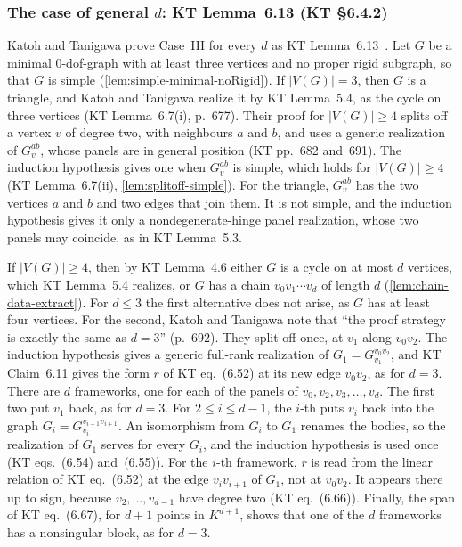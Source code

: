 \subsubsection{The case of general \texorpdfstring{$d$}{d}: KT Lemma~6.13 (KT \S6.4.2)}

Katoh and Tanigawa prove Case~III for every $d$ as KT
Lemma~6.13~\cite[pp.~692--698]{katohTanigawa2011}. Let $G$ be a
minimal $0$-dof-graph with at least three vertices and no proper rigid
subgraph, so that $G$ is simple (\cref{lem:simple-minimal-noRigid}).
If $|V(G)| = 3$, then $G$ is a triangle, and Katoh and Tanigawa
realize it by KT Lemma~5.4, as the cycle on three vertices (KT
Lemma~6.7(i), p.~677). Their proof for $|V(G)| \ge 4$ splits off a
vertex $v$ of degree two, with neighbours $a$ and $b$, and uses a
generic realization of $G_v^{ab}$, whose panels are in general position
(KT pp.~682 and~691). The induction hypothesis gives one when
$G_v^{ab}$ is simple, which holds for $|V(G)| \ge 4$ (KT Lemma~6.7(ii),
\cref{lem:splitoff-simple}). For the triangle, $G_v^{ab}$ has the
two vertices $a$ and $b$ and two edges that join them. It is not
simple, and the induction hypothesis gives it only a
nondegenerate-hinge panel realization, whose two panels may coincide,
as in KT Lemma~5.3.

If $|V(G)| \ge 4$, then by KT Lemma~4.6 either $G$ is a cycle on at
most $d$ vertices, which KT Lemma~5.4 realizes, or $G$ has a chain
$v_0 v_1 \cdots v_d$ of length $d$ (\cref{lem:chain-data-extract}).
For $d \le 3$ the first alternative does not arise, as $G$ has at
least four vertices. For the second, Katoh and Tanigawa note that
``the proof strategy is exactly the same as $d = 3$'' (p.~692). They
split off once, at $v_1$ along $v_0 v_2$. The induction hypothesis
gives a generic full-rank realization of $G_1 = G_{v_1}^{v_0 v_2}$,
and KT Claim~6.11 gives the form $r$ of KT eq.~(6.52) at its new edge
$v_0 v_2$, as for $d = 3$. There are $d$ frameworks, one for each of
the panels of $v_0, v_2, v_3, \dots, v_d$. The first two put $v_1$
back, as for $d = 3$. For $2 \le i \le d - 1$, the $i$-th puts $v_i$
back into the graph $G_i = G_{v_i}^{v_{i-1} v_{i+1}}$. An isomorphism
from $G_i$ to $G_1$ renames the bodies, so the realization of $G_1$
serves for every $G_i$, and the induction hypothesis is used once (KT
eqs.~(6.54) and~(6.55)). For the $i$-th framework, $r$ is read from
the linear relation of KT eq.~(6.52) at the edge $v_i v_{i+1}$ of
$G_1$, not at $v_0 v_2$. It appears there up to sign, because
$v_2, \dots, v_{d-1}$ have degree two (KT eq.~(6.66)). Finally, the
span of KT eq.~(6.67), for $d + 1$ points in $K^{d+1}$, shows that one
of the $d$ frameworks has a nonsingular block, as for $d = 3$.


